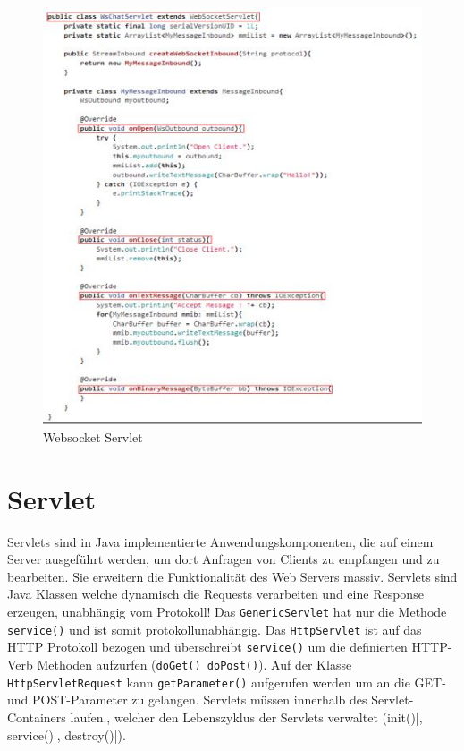\begin{figure}[h!]
	\centering
	\includegraphics[width=0.7\linewidth]{fig/java-websocket-servlet}
	\caption{Websocket Servlet}
	\label{fig:java-websocket-servlet}
\end{figure}


\newpage
\section{Servlet}
Servlets sind in Java implementierte Anwendungskomponenten, die auf einem Server ausgeführt werden, um dort Anfragen von Clients zu empfangen und zu bearbeiten. Sie erweitern die Funktionalität des Web Servers massiv. Servlets sind Java Klassen welche dynamisch die Requests verarbeiten und eine Response erzeugen, unabhängig vom Protokoll! Das \verb|GenericServlet| hat nur die Methode \verb|service()| und ist somit protokollunabhängig. Das \verb|HttpServlet| ist auf das HTTP Protokoll bezogen und überschreibt \verb|service()| um die definierten HTTP-Verb Methoden aufzurfen (\verb|doGet() doPost()|). Auf der Klasse \verb|HttpServletRequest| kann \verb|getParameter()| aufgerufen werden um an die GET- und POST-Parameter zu gelangen. Servlets müssen innerhalb des Servlet-Containers laufen., welcher den Lebenszyklus der Servlets verwaltet (\verb||init()|, \verb||service()|, \verb||destroy()|).

